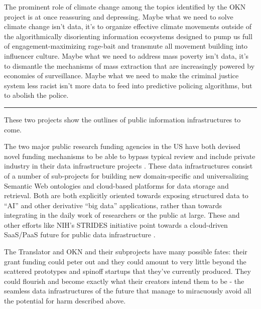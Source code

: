 The prominent role of climate change among the topics identified by the
OKN project is at once reassuring and depressing. Maybe what we need to
solve climate change isn't data, it's to organize effective climate
movements outside of the algorithmically disorienting information
ecosystems designed to pump us full of engagement-maximizing rage-bait
and transmute all movement building into influencer culture. Maybe what
we need to address mass poverty isn't data, it's to dismantle the
mechanisms of mass extraction that are increasingly powered by economies
of surveillance. Maybe what we need to make the criminal justice system
less racist isn't more data to feed into predictive policing algorithms,
but to abolish the police.

\begin{center}\rule{0.5\linewidth}{0.5pt}\end{center}

These two projects show the outlines of public information
infrastructures to come.

The two major public research funding agencies in the US have both
devised novel funding mechanisms to be able to bypass typical review and
include private industry in their data infrastructure projects \cite{nationalsciencefoundationNSFConvergenceAccelerator2019, consortiumBiomedicalDataTranslator2019} . These data infrastructures
consist of a number of sub-projects for building new domain-specific and
universalizing Semantic Web ontologies and cloud-based platforms for
data storage and retrieval. Both are both explicitly oriented towards
exposing structured data to ``AI'' and other derivative ``big data''
applications, rather than towards integrating in the daily work of
researchers or the public at large. These and other efforts like NIH's STRIDES initiative point towards a
cloud-driven SaaS/PaaS future for public data infrastructure \cite{nationalinstitutesofhealthSTRIDESInitiative2021} .

The Translator and OKN and their subprojects have many possible fates:
their grant funding could peter out and they could amount to very little
beyond the scattered prototypes and spinoff startups that they've
currently produced. They could flourish and become exactly what their
creators intend them to be - the seamless data infrastructures of the
future that manage to miracuously avoid all the potential for harm
described above.

